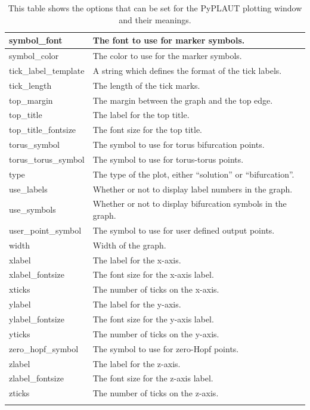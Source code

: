 \documentclass[12pt]{report}
\begin{document}
\begin{longtable}{| l | l |}
 \hline
 symbol\_font  &  The font to use for marker symbols. \\
 \hline
 symbol\_color  & The color to use for the marker symbols. \\
 \hline
 tick\_label\_template  & A string which defines the format of the tick labels. \\
 \hline
 tick\_length  &  The length of the tick marks. \\
 \hline
 top\_margin  & The margin between the graph and the top edge. \\
 \hline
 top\_title  &    The label for the top title. \\ 
 \hline
 top\_title\_fontsize  & The font size for the top title. \\ 
 \hline
 torus\_symbol  &    The symbol to use for torus bifurcation points. \\ 
 \hline
 torus\_torus\_symbol & The symbol to use for torus-torus points. \\
 \hline
 type  & The type of the plot, either ``solution'' or ``bifurcation''. \\  
 \hline
 use\_labels &   Whether or not to display label numbers in the graph. \\ 
 \hline
 use\_symbols  & Whether or not to display bifurcation symbols in the graph. \\
 \hline
 user\_point\_symbol  &   The symbol to use for user defined output points. \\ 
 \hline
 width  & Width of the graph. \\
 \hline
 xlabel  & The label for the x-axis. \\
 \hline
 xlabel\_fontsize  & The font size for the x-axis label. \\
 \hline
 xticks  & The number of ticks on the x-axis. \\
 \hline
 ylabel  & The label for the y-axis. \\
 \hline
 ylabel\_fontsize  & The font size for the y-axis label. \\
 \hline
 yticks  & The number of ticks on the y-axis. \\
 \hline
 zero\_hopf\_symbol & The symbol to use for zero-Hopf points. \\
 \hline
 zlabel  & The label for the z-axis. \\
 \hline
 zlabel\_fontsize  & The font size for the z-axis label. \\
 \hline
 zticks  & The number of ticks on the z-axis. \\
 \hline
 \caption[The options for the PyPLAUT plotting window.]
 {This table shows the options that
 can be set for the PyPLAUT plotting window and their meanings.}
 \label{tbl:clui plotter specific options}
 \end{longtable}
\end{document}
